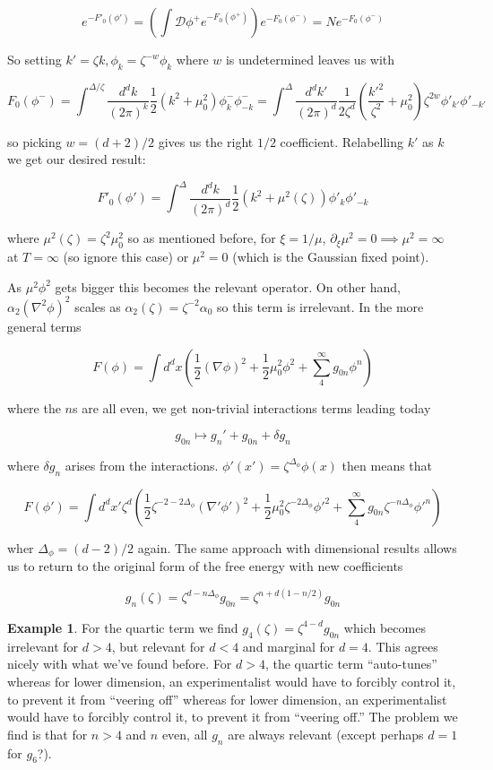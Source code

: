 \documentclass{article}
\theoremstyle{definition}
\newtheorem{example}{Example}
\begin{document}
$$ e^{-F'_0(\phi')} = \left( \int \mathcal{D}\phi^+ e^{-F_0(\phi^+)} \right)
e^{-F_0(\phi^-)} = Ne^{-F_0(\phi^-)} $$

So setting $k' = \zeta k, \phi_k = \zeta^{-w} \phi_k$ where $w$ is undetermined
leaves us with

$$ F_0(\phi^-) = \int^{\Delta / \zeta} \frac{d^d k}{(2\pi)^k} \frac{1}{2} (k^2 +
\mu_0^2) \phi_k^- \phi_{-k}^- = \int^\Delta \frac{d^d k'}{(2\pi)^d} \frac{1}{2
  \zeta^d} \left( \frac{k'^2}{\zeta^2} + \mu_0^2 \right) \zeta^{2w} \phi'_{k'}
\phi'_{-k'} $$

so picking $w = (d + 2) / 2$ gives us the right $1/2$ coefficient. Relabelling
$k'$ as $k$ we get our desired result:

$$ F'_0(\phi') = \int^\Delta \frac{d^d k}{(2\pi)^d} \frac{1}{2} (k^2 +
\mu^2(\zeta)) \phi'_k \phi'_{-k} $$

where $\mu^2(\zeta) = \zeta^2 \mu_0^2$ so as mentioned before, for $\xi = 1 /
\mu$,  $\partial_\xi \mu^2 = 0 \implies \mu^2 = \infty$ at $T = \infty$ (so
ignore this case) or $\mu^2 = 0$ (which is the Gaussian fixed point).

As $\mu^2 \phi^2$ gets bigger this becomes the relevant operator. On other hand,
$\alpha_2 (\nabla^2 \phi)^2$ scales as $\alpha_2(\zeta) = \zeta^{-2}\alpha_0$ so
this term is irrelevant. In the more general terms

$$ F(\phi) = \int d^dx \left( \frac{1}{2} (\nabla \phi)^2 + \frac{1}{2} \mu_0^2
  \phi^2 + \sum_4^\infty g_{0n} \phi^n \right) $$

where the $n$s are all even, we get non-trivial interactions terms leading today

$$ g_{0n} \mapsto g_n' + g_{0n} + \delta g_n $$

where $\delta g_n$ arises from the interactions. $\phi'(x') =
\zeta^{\Delta_\phi} \phi(x)$ then means that

$$ F(\phi') = \int d^d x' \zeta^d \left( \frac{1}{2} \zeta^{-2 - 2 \Delta_\phi}
  (\nabla' \phi')^2 + \frac{1}{2} \mu_0^2 \zeta^{-2\Delta_\phi} \phi'^2 +
  \sum_4^\infty g_{0n} \zeta^{-n\Delta_\phi} \phi'^n \right) $$

wher $\Delta_\phi = (d - 2) / 2$ again. The same approach with dimensional
results allows us to return to the original form of the free energy with new
coefficients

$$ g_n(\zeta) = \zeta^{d -n\Delta_\phi} g_{0n} = \zeta^{n + d(1 - n/2)}
g_{0n} $$

\begin{example}
  For the quartic term we find $g_4(\zeta) = \zeta^{4 - d}g_{0n}$ which becomes
  irrelevant for $d > 4$, but relevant for $d < 4$ and marginal for $d = 4$.
  This agrees nicely with what we've found before. For $d > 4$, the quartic term
  ``auto-tunes'' whereas for lower dimension, an experimentalist would have to
  forcibly control it, to prevent it from ``veering off'' whereas for lower
  dimension, an experimentalist would have to forcibly control it, to prevent it
  from ``veering off.'' The problem we find is that for $n > 4$ and $n$ even,
  all $g_n$ are always relevant (except perhaps $d = 1$ for $g_6$?).
\end{example}
\end{document}
